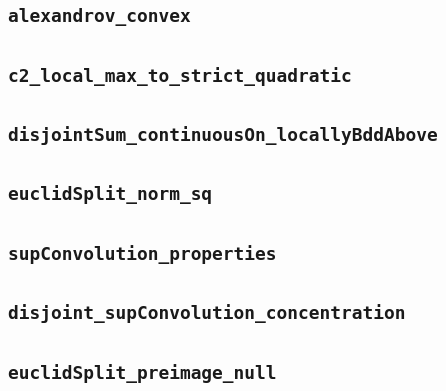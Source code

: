 \documentclass[11pt]{amsart}
\theoremstyle{definition}
\begin{document}
\subsection{\texorpdfstring{\texttt{alexandrov\_convex}}{alexandrov_convex}}\label{node:alexandrov_convex}


\subsection{\texorpdfstring{\texttt{c2\_local\_max\_to\_strict\_quadratic}}{c2_local_max_to_strict_quadratic}}\label{node:c2_local_max_to_strict_quadratic}


\subsection{\texorpdfstring{\texttt{disjointSum\_continuousOn\_locallyBddAbove}}{disjointSum_continuousOn_locallyBddAbove}}\label{node:disjointSum_continuousOn_locallyBddAbove}


\subsection{\texorpdfstring{\texttt{euclidSplit\_norm\_sq}}{euclidSplit_norm_sq}}\label{node:euclidSplit_norm_sq}


\subsection{\texorpdfstring{\texttt{supConvolution\_properties}}{supConvolution_properties}}\label{node:supConvolution_properties}


\subsection{\texorpdfstring{\texttt{disjoint\_supConvolution\_concentration}}{disjoint_supConvolution_concentration}}\label{node:disjoint_supConvolution_concentration}


\subsection{\texorpdfstring{\texttt{euclidSplit\_preimage\_null}}{euclidSplit_preimage_null}}\label{node:euclidSplit_preimage_null}

\end{document}
